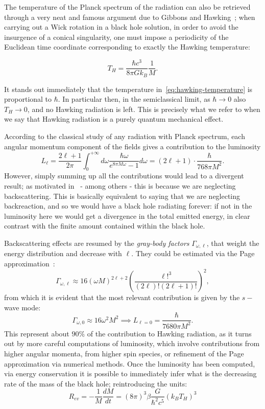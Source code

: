 The temperature of the Planck spectrum of the radiation can also be retrieved through a very neat and famous argument due to Gibbons and Hawking~\cite[]{gibbons1993action}; when carrying out a Wick rotation in a black hole solution, in order to avoid the insurgence of a conical singularity, one must impose a periodicity of the Euclidean time coordinate corresponding to exactly the Hawking temperature:

\begin{equation}
	\label{eq:hawking-temperature}
	T_H = \frac{\hbar c^3}{8\pi Gk_B}\frac{1}{M}.
\end{equation}

\begin{remark}
	It stands out immediately that the temperature in~\eqref{eq:hawking-temperature} is proportional to \(\hbar\). In particular then, in the semiclassical limit, as \(\hbar \rightarrow 0\) also \(T_H \rightarrow 0\), and no Hawking radiation is left. This is precisely what we refer to when we say that Hawking radiation is a purely quantum mechanical effect.
\end{remark}

According to the classical study of any radiation with Planck spectrum, each angular momentum component of the fields gives a contribution to the luminosity
\[
L_{\ell} = \frac{2\ell + 1}{2\pi} \int_0^{+\infty} d\omega \frac{\hbar\omega}{e^{8\pi M\omega} - 1}	d\omega  = (2\ell + 1) \cdot\frac{\hbar}{768\pi M^2}.
\]
However, simply summing up all the contributions would lead to a divergent result; as motivated in~\cite[]{fabbri2005modeling} - among others - this is because we are neglecting backscattering. This is basically equivalent to saying that we are neglecting backreaction, and so we would have a black hole radiating forever: if not in the luminosity here we would get a divergence in the total emitted energy, in clear contrast with the finite amount contained within the black hole.

Backscattering effects are resumed by the \emph{gray-body factors} \(\Gamma_{\omega, \ell}\), that weight the energy distribution and decrease with \(\ell\). They could be estimated via the Page approximation~\cite[]{page1976particle}:
\[
	\Gamma_{\omega,\ell} \approx 16(\omega M)^{2\ell + 2}\left(\frac{\ell!^3}{(2\ell)!(2\ell + 1)!}\right)^2,
\]
from which it is evident that the most relevant contribution is given by the \(s-\)wave mode:
\[
\Gamma_{\omega, 0} \approx 16\omega^2M^2 \implies L_{\ell = 0} = \frac{\hbar}{7680\pi M^2}.
\]
This represent about \(90\%\) of the contribution to Hawking radiation, as it turns out by more careful computations of luminosity, which involve contributions from higher angular momenta, from higher spin species, or refinement of the Page approximation via numerical methods.
Once the luminosity has been computed, via energy conservation it is possible to immediately infer what is the decreasing rate of the mass of the black hole; reintroducing the units:
\begin{equation}
	\label{eq:evaporation-rate}
	R_{ev} = -\frac{1}{M}\frac{dM}{dt} = (8\pi)^3\beta \frac{G}{\hbar^2c^5}\left(k_BT_H\right)^3
\end{equation}

